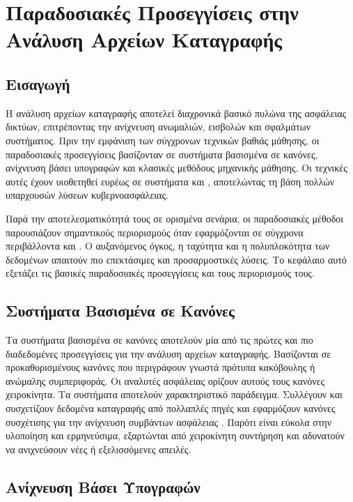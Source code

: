 \section{Παραδοσιακές Προσεγγίσεις στην Ανάλυση Αρχείων Καταγραφής}

\subsection{Εισαγωγή}

Η ανάλυση αρχείων καταγραφής αποτελεί διαχρονικά βασικό πυλώνα της ασφάλειας δικτύων, επιτρέποντας την ανίχνευση ανωμαλιών, εισβολών και σφαλμάτων συστήματος. Πριν την εμφάνιση των σύγχρονων τεχνικών βαθιάς μάθησης, οι παραδοσιακές προσεγγίσεις βασίζονταν σε συστήματα βασισμένα σε κανόνες, ανίχνευση βάσει υπογραφών και κλασικές μεθόδους μηχανικής μάθησης. Οι τεχνικές αυτές έχουν υιοθετηθεί ευρέως σε συστήματα  και , αποτελώντας τη βάση πολλών υπαρχουσών λύσεων κυβερνοασφάλειας.

Παρά την αποτελεσματικότητά τους σε ορισμένα σενάρια, οι παραδοσιακές μέθοδοι παρουσιάζουν σημαντικούς περιορισμούς όταν εφαρμόζονται σε σύγχρονα περιβάλλοντα  και . Ο αυξανόμενος όγκος, η ταχύτητα και η πολυπλοκότητα των δεδομένων απαιτούν πιο επεκτάσιμες και προσαρμοστικές λύσεις. Το κεφάλαιο αυτό εξετάζει τις βασικές παραδοσιακές προσεγγίσεις και τους περιορισμούς τους.

\subsection{Συστήματα Βασισμένα σε Κανόνες}

Τα συστήματα βασισμένα σε κανόνες αποτελούν μία από τις πρώτες και πιο διαδεδομένες προσεγγίσεις για την ανάλυση αρχείων καταγραφής. Βασίζονται σε προκαθορισμένους κανόνες που περιγράφουν γνωστά πρότυπα κακόβουλης ή ανώμαλης συμπεριφοράς. Οι αναλυτές ασφάλειας ορίζουν αυτούς τους κανόνες χειροκίνητα. Τα συστήματα  αποτελούν χαρακτηριστικό παράδειγμα. Συλλέγουν και συσχετίζουν δεδομένα καταγραφής από πολλαπλές πηγές και εφαρμόζουν κανόνες συσχέτισης για την ανίχνευση συμβάντων ασφάλειας \cite{behl2017cybersecurity}. Παρότι είναι εύκολα στην υλοποίηση και ερμηνεύσιμα, εξαρτώνται από χειροκίνητη συντήρηση και αδυνατούν να ανιχνεύσουν νέες ή εξελισσόμενες απειλές.

\subsection{Ανίχνευση Βάσει Υπογραφών}

